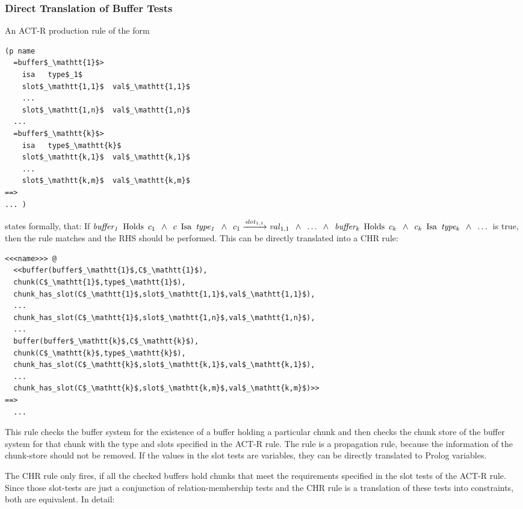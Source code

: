 \subsubsection{Direct Translation of Buffer Tests}

An ACT-R production rule of the form

\begin{lstlisting}[mathescape]
(p name
  =buffer$_\mathtt{1}$>
    isa   type$_1$
    slot$_\mathtt{1,1}$  val$_\mathtt{1,1}$
    ...
    slot$_\mathtt{1,n}$  val$_\mathtt{1,n}$
  ...
  =buffer$_\mathtt{k}$>
    isa   type$_\mathtt{k}$
    slot$_\mathtt{k,1}$  val$_\mathtt{k,1}$
    ...
    slot$_\mathtt{k,m}$  val$_\mathtt{k,m}$
==>
... )
\end{lstlisting}

states formally, that: If $\mathord{\mathit{buffer_1}} \enspace \mathord{\mathrm{Holds}} \enspace c_1 \enspace \wedge \enspace c \enspace \mathord{\mathrm{Isa}} \enspace \mathord{\mathit{type_1}} \enspace \wedge \enspace c_1 \xrightarrow{\mathord{\mathit{slot}}_{1,1}} \mathord{\mathit{val}}_{1,1} \enspace \wedge \enspace \dots \enspace \wedge \enspace \mathord{\mathit{buffer_k}} \enspace \mathord{\mathrm{Holds}} \enspace c_k \enspace \wedge \enspace c_k \enspace \mathord{\mathrm{Isa}} \enspace \mathord{\mathit{type_k}} \enspace \wedge \enspace \dots$ is true, then the rule matches and the RHS should be performed. This can be directly translated into a CHR rule:

\begin{lstlisting}[mathescape]
<<<name>>> @
  <<buffer(buffer$_\mathtt{1}$,C$_\mathtt{1}$),
  chunk(C$_\mathtt{1}$,type$_\mathtt{1}$),
  chunk_has_slot(C$_\mathtt{1}$,slot$_\mathtt{1,1}$,val$_\mathtt{1,1}$),
  ...
  chunk_has_slot(C$_\mathtt{1}$,slot$_\mathtt{1,n}$,val$_\mathtt{1,n}$),
  ...
  buffer(buffer$_\mathtt{k}$,C$_\mathtt{k}$),
  chunk(C$_\mathtt{k}$,type$_\mathtt{k}$),
  chunk_has_slot(C$_\mathtt{k}$,slot$_\mathtt{k,1}$,val$_\mathtt{k,1}$),
  ...
  chunk_has_slot(C$_\mathtt{k}$,slot$_\mathtt{k,m}$,val$_\mathtt{k,m}$)>>
==>
  ...
\end{lstlisting}

This rule checks the buffer system for the existence of a buffer holding a particular chunk and then checks the chunk store of the buffer system for that chunk with the type and slots specified in the ACT-R rule. The rule is a propagation rule, because the information of the chunk-store should not be removed. If the values in the slot tests are variables, they can be directly translated to Prolog variables.

The CHR rule only fires, if all the checked buffers hold chunks that meet the requirements specified in the slot tests of the ACT-R rule. Since those slot-tests are just a conjunction of relation-membership tests and the CHR rule is a translation of these tests into constraints, both are equivalent. In detail: 

